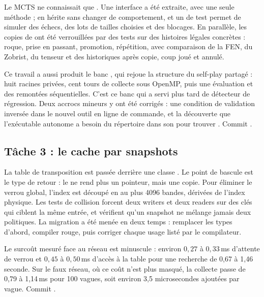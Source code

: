 Le MCTS ne connaissait que . Une interface
 a \'et\'e extraite, avec une seule m\'ethode
 ;  en h\'erite sans changer de
comportement, et un  de test permet de simuler des
\'echecs, des lots de tailles choisies et des blocages. En parall\`ele, les
copies de  ont \'et\'e verrouill\'ees par des tests sur des
histoires l\'egales concr\`etes : roque, prise en passant, promotion,
r\'ep\'etition, avec comparaison de la FEN, du Zobrist, du tenseur et des
historiques apr\`es copie, coup jou\'e et annul\'e.

Ce travail a aussi produit le banc , qui rejoue la
structure du self-play partag\'e : huit racines priv\'ees, cent tours de
collecte sous OpenMP, puis une \'evaluation et des remont\'ees
s\'equentielles. C'est ce banc qui a servi plus tard de d\'etecteur de
r\'egression. Deux accrocs mineurs y ont \'et\'e corrig\'es : une condition de
validation invers\'ee dans le nouvel outil en ligne de commande, et la
d\'ecouverte que l'ex\'ecutable autonome a besoin du r\'epertoire
 dans son  pour trouver . Commit
.

\subsection{T\^ache 3 : le cache par snapshots}
\label{sec:t3}

La table de transposition est pass\'ee derri\`ere une classe
. Le point de bascule est le type de retour : le
 ne rend plus un pointeur, mais une copie. Pour \'eliminer le
verrou global, l'index est d\'ecoup\'e en au plus 4096 bandes, d\'eriv\'ees
de l'index physique. Les tests de collision forcent deux writers et deux
readers sur des cl\'es qui ciblent la m\^eme entr\'ee, et v\'erifient qu'un
snapshot ne m\'elange jamais deux politiques. La migration a \'et\'e men\'ee
en deux temps : remplacer les types d'abord, compiler rouge, puis corriger
chaque usage list\'e par le compilateur.

Le surco\^ut mesur\'e face au r\'eseau est minuscule : environ
$0{,}27$ \`a $0{,}33$\,ms d'attente de verrou et $0{,}45$ \`a
$0{,}50$\,ms d'acc\`es \`a la table pour une recherche de 0,67 \`a
1,46 seconde. Sur le faux r\'eseau, o\`u ce co\^ut n'est plus masqu\'e, la
collecte passe de 0,79 \`a 1,14\,ms pour 100 vagues, soit environ 3,5
microsecondes ajout\'ees par vague. Commit .

